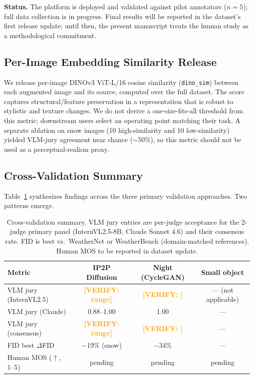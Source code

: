 \documentclass[12pt]{article}
\newcommand{\verify}[1]{\textcolor{orange}{\textbf{[VERIFY: #1]}}}
\begin{document}
\textbf{Status.} The platform is deployed and validated against pilot annotators ($n{=}5$); full data collection is in progress. Final results will be reported in the dataset's first release update; until then, the present manuscript treats the human study as a methodological commitment.

\subsection{Per-Image Embedding Similarity Release}
\label{sec:per-image}

We release per-image DINOv3 ViT-L/16 cosine similarity (\texttt{dino\_sim}) between each augmented image and its source, computed over the full dataset. The score captures structural/feature preservation in a representation that is robust to stylistic and texture changes. We do not derive a one-size-fits-all threshold from this metric; downstream users select an operating point matching their task. A separate ablation on snow images (10 high-similarity and 10 low-similarity) yielded VLM-jury agreement near chance ($\sim$50\%), so this metric should not be used as a perceptual-realism proxy.

\subsection{Cross-Validation Summary}
\label{sec:cross-validation}

Table~\ref{tab:cross-validation} synthesizes findings across the three primary validation approaches. Two patterns emerge.

\begin{table}[H]
\centering
\caption{Cross-validation summary. VLM jury entries are per-judge acceptance for the 2-judge primary panel (InternVL2.5-8B, Claude Sonnet 4.6) and their consensus rate. FID is best vs.\ WeatherNet or WeatherBench (domain-matched references). Human MOS to be reported in dataset update.}
\label{tab:cross-validation}
\small
\begin{tabular}{lccc}
\toprule
\textbf{Metric} & \textbf{IP2P Diffusion} & \textbf{Night (CycleGAN)} & \textbf{Small object} \\
\midrule
VLM jury (InternVL2.5)              & \verify{range}     & \verify{}       & --- (not applicable) \\
VLM jury (Claude)                   & 0.88--1.00         & 1.00            & --- \\
VLM jury (consensus)                & \verify{range}     & \verify{}       & --- \\
FID best $\Delta$FID                & $-$19\% (snow)     & $-$34\%         & --- \\
Human MOS ($\uparrow$, 1--5)        & pending            & pending         & pending \\
\bottomrule
\end{tabular}
\end{table}
\end{document}
